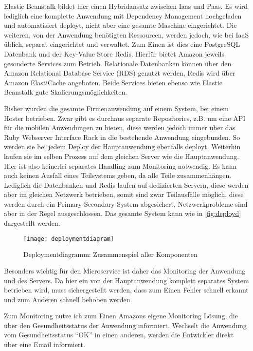 Elastic Beanstalk bildet hier einen Hybridansatz zwischen Iaas und Paas. Es wird lediglich eine komplette Anwendung mit Dependency Management hochgeladen und automatisiert deployt, nicht aber eine gesamte Maschine eingerichtet.
Die weiteren, von der Anwendung benötigten Ressourcen, werden jedoch, wie bei IaaS üblich, separat eingerichtet und verwaltet. Zum Einen ist dies eine PostgreSQL Datenbank und der Key-Value Store Redis. Hierfür bietet Amazon jeweils gesonderte Services zum Betrieb. Relationale Datenbanken können über den Amazon Relational Database Service (RDS)\cite{aws:rds} genutzt werden, Redis wird über Amazon ElastiCache\cite{aws:elasticache} angeboten. Beide Services bieten ebenso wie Elastic Beanstalk gute Skalierungsmöglichkeiten.

Bisher wurden die gesamte Firmenanwendung auf einem System, bei einem Hoster betrieben. Zwar gibt es durchaus separate Repositories, z.B. um eine API für die mobilen Anwendungen zu bieten, diese werden jedoch immer über das Ruby Webserver Interface Rack in die bestehende Anwendung eingebunden. So werden sie bei jedem Deploy der Hauptanwendung ebenfalls deployt. Weiterhin laufen sie im selben Prozess auf dem gleichen Server wie die Hauptanwendung. Hier ist also keinerlei separates Handling zum Monitoring notwendig. Es kann auch keinen Ausfall eines Teilsystems geben, da alle Teile zusammenhängen. Lediglich die Datenbanken und Redis laufen auf dedizierten Servern, diese werden aber im gleichen Netzwerk betrieben, somit sind zwar Teilausfälle möglich, diese werden durch ein Primary-Secondary System abgesichert, Netzwerkprobleme sind aber in der Regel ausgeschlossen. Das gesamte System kann wie in \autoref{fig:deployd} dargestellt werden.

\begin{figure}[!ht]
    \centering
    \caption{Deploymentdiagramm: Zusammenspiel aller Komponenten}
    \label{fig:deployd}
    \texttt{[image: deploymentdiagram]}
\end{figure}

Besonders wichtig für den Microservice ist daher das Monitoring der Anwendung und des Servers. Da hier ein von der Hauptanwendung komplett separates System betrieben wird, muss sichergestellt werden, dass zum Einen Fehler schnell erkannt und zum Anderen schnell behoben werden. 

Zum Monitoring nutze ich zum Einen Amazons eigene Monitoring Lösung, die über den Gesundheitsstatus der Anwendung informiert. Wechselt die Anwendung vom Gesundheitsstatus ``OK'' in einen anderen, werden die Entwickler direkt über eine Email informiert.

